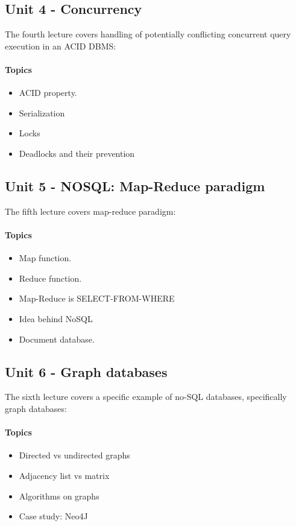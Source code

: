 	\subsection{Unit 4 - Concurrency}
		The fourth lecture covers handling of potentially conflicting concurrent query execution in an ACID DBMS:

		\paragraph*{Topics}
			\begin{itemize}
				\item ACID property.
				\item Serialization
				\item Locks
				\item Deadlocks and their prevention
			\end{itemize}


	\subsection{Unit 5 - NOSQL: Map-Reduce paradigm}
		The fifth lecture covers map-reduce paradigm:

		\paragraph*{Topics}
			\begin{itemize}
				\item Map function.
				\item Reduce function.
				\item Map-Reduce is SELECT-FROM-WHERE
				\item Idea behind NoSQL
				\item Document database.
			\end{itemize}


	\subsection{Unit 6 - Graph databases}
		The sixth lecture covers a specific example of no-SQL databases, specifically graph databases:

		\paragraph*{Topics}
			\begin{itemize}
				\item Directed vs undirected graphs
				\item Adjacency list vs matrix
				\item Algorithms on graphs
				\item Case study: Neo4J
			\end{itemize}
